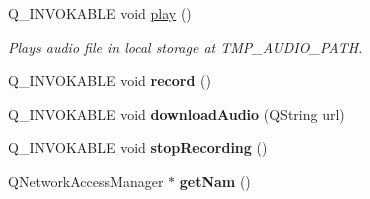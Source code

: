 \begin{DoxyCompactItemize}
\item 
\hypertarget{classHttpManager_a5d7a7272de96966d3bcf40c4448ed55f}{Q\-\_\-\-I\-N\-V\-O\-K\-A\-B\-L\-E void \hyperlink{classHttpManager_a5d7a7272de96966d3bcf40c4448ed55f}{play} ()}\label{classHttpManager_a5d7a7272de96966d3bcf40c4448ed55f}

\begin{DoxyCompactList}\small\item\em Plays audio file in local storage at T\-M\-P\-\_\-\-A\-U\-D\-I\-O\-\_\-\-P\-A\-T\-H. \end{DoxyCompactList}\item 
\hypertarget{classHttpManager_adc162b753bd1ca62d74672e96a4775e2}{Q\-\_\-\-I\-N\-V\-O\-K\-A\-B\-L\-E void {\bfseries record} ()}\label{classHttpManager_adc162b753bd1ca62d74672e96a4775e2}

\item 
\hypertarget{classHttpManager_a9baefea195b0e488348adeb82a0d80e1}{Q\-\_\-\-I\-N\-V\-O\-K\-A\-B\-L\-E void {\bfseries download\-Audio} (Q\-String url)}\label{classHttpManager_a9baefea195b0e488348adeb82a0d80e1}

\item 
\hypertarget{classHttpManager_a80653bae4b0a66f9eda4c372d144c1be}{Q\-\_\-\-I\-N\-V\-O\-K\-A\-B\-L\-E void {\bfseries stop\-Recording} ()}\label{classHttpManager_a80653bae4b0a66f9eda4c372d144c1be}

\item 
\hypertarget{classHttpManager_a4b5be6b80df7be50e135181ded11e5b5}{Q\-Network\-Access\-Manager $\ast$ {\bfseries get\-Nam} ()}\label{classHttpManager_a4b5be6b80df7be50e135181ded11e5b5}

\end{DoxyCompactItemize}
